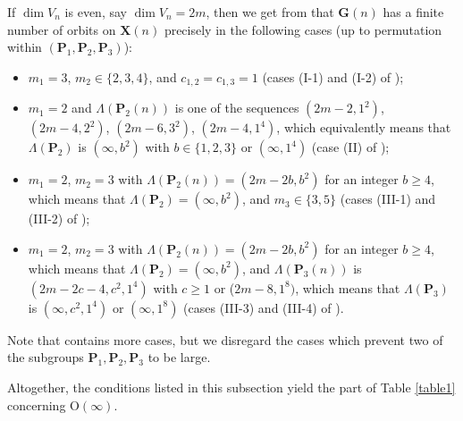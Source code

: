 \documentclass[12pt]{amsart}
\renewcommand{\O}{\mathrm{O}}
\newcommand{\G}{\mathbf{G}}
\renewcommand{\P}{\mathbf{P}}
\newcommand{\X}{\mathbf{X}}
\numberwithin{equation}{section}
\theoremstyle{definition}
\begin{document}
\begin{appendix}
If $\dim V_n$ is even, say $\dim V_n=2m$, then we get from \cite[Theorem 1.7]{Matsuki2} that  $\G(n)$ has a finite number of orbits on $\X(n)$ precisely in the following cases (up to permutation within $(\P_1,\P_2,\P_3)$):
\begin{itemize}
\item $m_1=3$, $m_2\in\{2,3,4\}$, and $c_{1,2}=c_{1,3}=1$ (cases (I-1) and (I-2) of \cite[Theorem 1.7]{Matsuki2});
\item $m_1=2$ and $\Lambda(\P_2(n))$ is one of the sequences $(2m-2,1^2)$, $(2m-4,2^2)$, $(2m-6,3^2)$, $(2m-4,1^4)$, which equivalently means that $\Lambda(\P_2)$ is $(\infty,b^2)$ with $b\in\{1,2,3\}$ or $(\infty,1^4)$ (case (II) of \cite[Theorem 1.7]{Matsuki2});
\item $m_1=2$, $m_2=3$ with $\Lambda(\P_2(n))=(2m-2b,b^2)$ for an integer $b\geq 4$, which means that $\Lambda(\P_2)=(\infty,b^2)$, and $m_3\in\{3,5\}$ (cases (III-1) and (III-2) of \cite[Theorem 1.7]{Matsuki2});
\item $m_1=2$, $m_2=3$ with $\Lambda(\P_2(n))=(2m-2b,b^2)$ for an integer $b\geq 4$, which means that $\Lambda(\P_2)=(\infty,b^2)$, and $\Lambda(\P_3(n))$ is $(2m-2c-4,c^2,1^4)$ with $c\geq 1$ or ($2m-8,1^8)$, which means that $\Lambda(\P_3)$ is $(\infty,c^2,1^4)$ or $(\infty,1^8)$ (cases (III-3) and (III-4) of \cite[Theorem 1.7]{Matsuki2}).
\end{itemize}
Note that \cite[Theorem 1.7]{Matsuki2} contains more cases, but we disregard the cases which prevent two of the subgroups $\P_1,\P_2,\P_3$ to be large.

Altogether, the conditions listed in this subsection yield the part of Table \ref{table1} concerning $\O(\infty)$.
\end{appendix}
\end{document}
